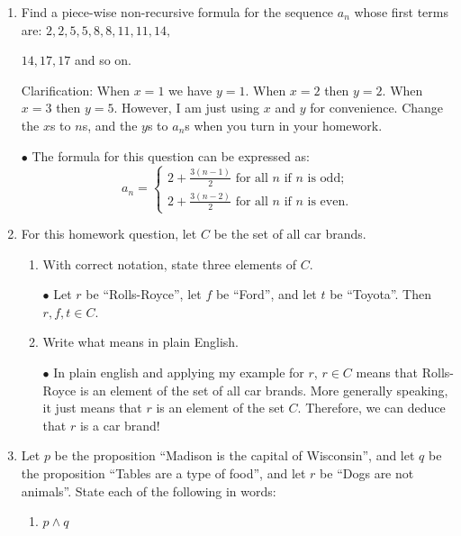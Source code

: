 \documentclass{article}
\begin{document}
\begin{enumerate}

      \newpage

      \item
            Find a piece-wise non-recursive formula for the sequence $a_n$ whose first terms are: $2,2,5,5,8,8,11,11,14,$

            $14,17,17$ and so on.

            Clarification: When $x=1$ we have $y=1$. When $x=2$ then $y=2$. When $x=3$ then $y=5$. However, I am just using $x$ and $y$ for convenience. Change the $x$s to $n$s, and the $y$s to $a_n$s when you turn in your homework.

            $\bullet$ The formula for this question can be expressed as:
            \[
                  a_n = \begin{cases}
                        2 + \frac{3(n-1)}{2} \text{ for all } n \text{ if } n \text{ is odd;} \\
                        2 + \frac{3(n-2)}{2} \text{ for all } n \text{ if } n \text{ is even.}
                  \end{cases}
            \]

            \newpage

      \item
            For this homework question, let $C$ be the set of all car brands.
            \begin{enumerate}
                  \item With correct notation, state three elements of $C$.

                        $\bullet$ Let $r$ be ``Rolls-Royce'', let $f$ be ``Ford'', and let $t$ be ``Toyota''. Then $r, f, t \in C$.

                  \item Write what  means in plain English.

                        $\bullet$ In plain english and applying my example for $r$, $r \in C$ means that Rolls-Royce is an element of the set of all car brands. More generally speaking, it just means that $r$ is an element of the set $C$. Therefore, we can deduce that $r$ is a car brand!

            \end{enumerate}

            \newpage

      \item
            Let $p$ be the proposition ``Madison is the capital of Wisconsin'', and let $q$ be the proposition ``Tables are a type of food'', and let $r$ be ``Dogs are not animals''. State each of the following in words:
            \begin{enumerate}
                  \item $p \wedge q$


\end{enumerate}
\end{enumerate}
\end{document}

